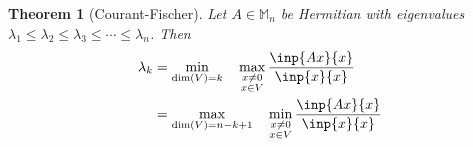 \documentclass[twoside]{article}
\newcommand*\abs[1]{\left \vert #1 \right\vert}
\theoremstyle{plain}
\newtheorem{theorem}{Theorem}
\theoremstyle{definition}
\theoremstyle{remark}
\begin{document}




\begin{theorem}[Courant-Fischer] Let \(A \in \mathbb{M}_n\) be Hermitian  with eigenvalues \(\lambda_1 \le \lambda_2 \le \lambda_3 \le \cdots \le \lambda_n\).  Then 
\begin{equation*}\begin{split}
 \lambda_k &= \min_{\dim(V) = k}  \quad \max_{\substack{x \ne 0 \\ x \in V}} \frac{\inp{Ax}{x}}{\inp{x}{x}} \\
& = \max_{\dim(V) = n - k + 1} \quad \min_{\substack{x \ne 0 \\ x \in V}} \frac{\inp{Ax}{x}}{\inp{x}{x}}
\end{split} \end{equation*}
 \end{theorem}
\end{document}
